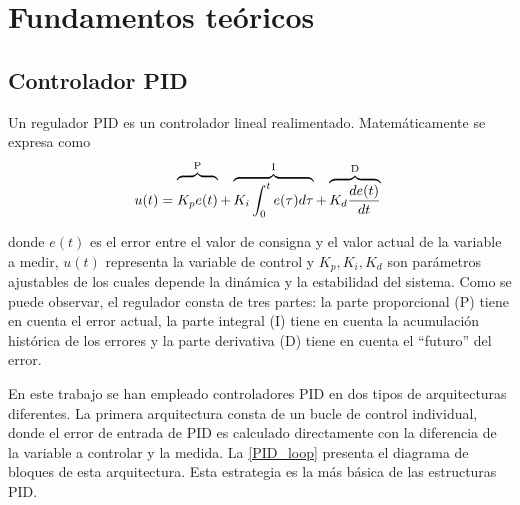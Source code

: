 \chapter{Fundamentos teóricos}








\section{Controlador PID}

Un regulador PID es un controlador lineal realimentado. Matemáticamente se expresa como 
\begin{equation}
	u(t) = \overbrace{\raisebox{0ex}[2.2\height]{$K_p e(t)$}}^\text{P} +\overbrace{K_i \int_{0}^{t}e(\tau)d\tau}^\text{I} + \overbrace{ K_d \frac{de(t)}{dt}}^\text{D}\;
\end{equation}

donde $e(t)$ es el error entre el valor de consigna y el valor actual de la variable a medir, $u(t)$ representa la variable de control y $K_p,K_i,K_d$ son parámetros ajustables de los cuales depende la dinámica y la estabilidad del sistema. Como se puede observar, el regulador consta de tres partes: la parte proporcional (P) tiene en cuenta el error actual, la parte integral (I) tiene en cuenta la acumulación histórica de los errores y la parte derivativa (D) tiene en cuenta el ``futuro'' del error.

En este trabajo se han empleado controladores PID en dos tipos de arquitecturas diferentes. La primera arquitectura consta de un bucle de control individual, donde el error de entrada de PID es calculado directamente con la diferencia de la variable a controlar y la medida. La \cref{PID_loop} presenta el diagrama de bloques de esta arquitectura. Esta estrategia es la más básica de las estructuras PID.

